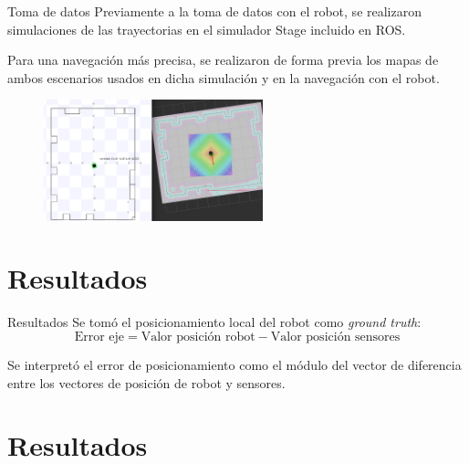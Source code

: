 \documentclass[xcolor=table]{beamer}
\begin{document}
  \begin{frame}{Toma de datos}
    Previamente a la toma de datos con el robot, se realizaron simulaciones de las trayectorias en el simulador Stage incluido en ROS.

    Para una navegación más precisa, se realizaron de forma previa los mapas de ambos escenarios usados en dicha simulación y en la navegación con el robot.

    \begin{figure}[H]
      \centering
      \includegraphics[height=3.5cm]{pic/Stage-rviz.png}
      \label{fig:robot}
  \end{figure}
  \end{frame}

\section{Resultados}
  \begin{frame}{Resultados}
    Se tomó el posicionamiento local del robot como \textit{ground truth}:
    \begin{equation*}\label{eq:Diff_eje}
      \text{Error eje} = \text{Valor posición robot} - \text{Valor posición sensores}
    \end{equation*}

    Se interpretó el error de posicionamiento como el módulo del vector de diferencia entre los vectores de posición de robot y sensores.
    \begin{figure}[H]
      \centering
      
    \end{figure}
  \end{frame}

\section[Laboratorio]{Resultados}
\end{document}
